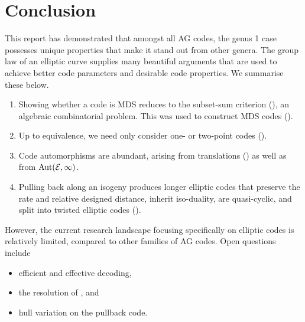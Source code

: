 \documentclass[twocolumn, 11pt]{scrartcl}
\begin{document}
\section{Conclusion} \label{section:conclusion}

This report has demonstrated that amongst all AG codes, the genus 1 case possesses unique properties that make it stand out from other genera. The group law of an elliptic curve supplies many beautiful arguments that are used to achieve better code parameters and desirable code properties. We summarise these below.

\begin{enumerate}
    \item Showing whether a code is MDS reduces to the subset-sum criterion (), an algebraic combinatorial problem. This was used to construct MDS codes ().
    \item Up to equivalence, we need only consider one- or two-point codes ().
    \item Code automorphisms are abundant, arising from translations () as well as from $\operatorname{Aut}(\mathcal{E},\infty)$.
    \item Pulling back along an isogeny produces longer elliptic codes that preserve the rate and relative designed distance, inherit iso-duality, are quasi-cyclic, and split into twisted elliptic codes ().
\end{enumerate}

However, the current research landscape focusing specifically on elliptic codes is relatively limited, compared to other families of AG codes. Open questions include
\begin{itemize}[itemsep=-10pt]
    \item efficient and effective decoding,
    \item the resolution of , and
    \item hull variation on the pullback code.
\end{itemize}

\printbibliography

\end{document}
